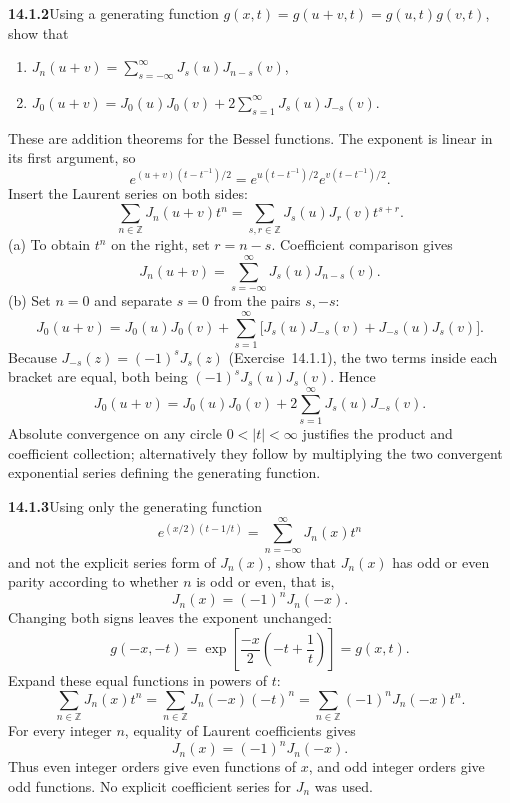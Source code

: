 \par\bigskip
\noindent\textbf{14.1.2}\quad Using a generating function
$g(x,t)=g(u+v,t)=g(u,t)g(v,t)$, show that
\begin{enumerate}
\item[(a)] $J_{n}(u+v)=\displaystyle\sum_{s=-\infty}^{\infty}
J_{s}(u)J_{n-s}(v)$,
\item[(b)] $J_{0}(u+v)=J_{0}(u)J_{0}(v)+2\displaystyle\sum_{s=1}^{\infty}
J_{s}(u)J_{-s}(v)$.
\end{enumerate}
These are addition theorems for the Bessel functions.
\solution
The exponent is linear in its first argument, so
\[
e^{(u+v)(t-t^{-1})/2}=e^{u(t-t^{-1})/2}e^{v(t-t^{-1})/2}.
\]
Insert the Laurent series on both sides:
\[
\sum_{n\in\mathbb Z}J_n(u+v)t^n
=\sum_{s,r\in\mathbb Z}J_s(u)J_r(v)t^{s+r}.
\]
(a) To obtain $t^n$ on the right, set $r=n-s$. Coefficient comparison
gives
\[
\boxed{J_n(u+v)=\sum_{s=-\infty}^{\infty}J_s(u)J_{n-s}(v).}
\]
(b) Set $n=0$ and separate $s=0$ from the pairs $s,-s$:
\[
J_0(u+v)=J_0(u)J_0(v)+\sum_{s=1}^{\infty}
\bigl[J_s(u)J_{-s}(v)+J_{-s}(u)J_s(v)\bigr].
\]
Because $J_{-s}(z)=(-1)^sJ_s(z)$ (Exercise~14.1.1), the two terms
inside each bracket are equal, both being $(-1)^sJ_s(u)J_s(v)$. Hence
\[
\boxed{J_0(u+v)=J_0(u)J_0(v)+2\sum_{s=1}^{\infty}J_s(u)J_{-s}(v).}
\]
Absolute convergence on any circle $0<|t|<\infty$ justifies the product
and coefficient collection; alternatively they follow by multiplying
the two convergent exponential series defining the generating function.

\par\bigskip
\noindent\textbf{14.1.3}\quad Using only the generating function
\[
e^{(x/2)(t-1/t)}=\sum_{n=-\infty}^{\infty}J_{n}(x)t^{n}
\]
and not the explicit series form of $J_{n}(x)$, show that $J_{n}(x)$ has
odd or even parity according to whether $n$ is odd or even, that is,
\[
J_{n}(x)=(-1)^{n}J_{n}(-x).
\]
\solution
Changing both signs leaves the exponent unchanged:
\[
g(-x,-t)=\exp\left[\frac{-x}{2}\left(-t+\frac1t\right)\right]
=g(x,t).
\]
Expand these equal functions in powers of $t$:
\[
\sum_{n\in\mathbb Z}J_n(x)t^n
=\sum_{n\in\mathbb Z}J_n(-x)(-t)^n
=\sum_{n\in\mathbb Z}(-1)^nJ_n(-x)t^n.
\]
For every integer $n$, equality of Laurent coefficients gives
\[
\boxed{J_n(x)=(-1)^nJ_n(-x).}
\]
Thus even integer orders give even functions of $x$, and odd integer
orders give odd functions. No explicit coefficient series for $J_n$
was used.

